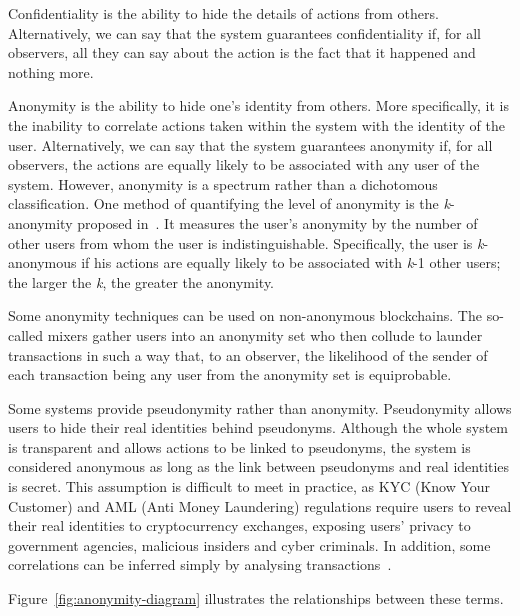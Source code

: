 \documentclass[pdftex,twocolumn,epjc3]{svjour3}
\begin{document}
{Confidentiality is the ability to hide the details of actions from others. Alternatively, we can say that the system guarantees confidentiality if, for all observers, all they can say about the action is the fact that it happened and nothing more.

Anonymity is the ability to hide one's identity from others. More specifically, it is the inability to correlate actions taken within the system with the identity of the user. Alternatively, we can say that the system guarantees anonymity if, for all observers, the actions are equally likely to be associated with any user of the system. However, anonymity is a spectrum rather than a dichotomous classification. One method of quantifying the level of anonymity is the \textit{k}-anonymity proposed in~\cite{sweeneyKanonymityModelProtecting2002}. It measures the user's anonymity by the number of other users from whom the user is indistinguishable. Specifically, the user is \textit{k}-anonymous if his actions are equally likely to be associated with \textit{k}-1 other users; the larger the \textit{k}, the greater the anonymity.

Some anonymity techniques can be used on non-anonymous blockchains. The so-called mixers gather users into an anonymity set who then collude to launder transactions in such a way that, to an observer, the likelihood of the sender of each transaction being any user from the anonymity set is equiprobable.

Some systems provide pseudonymity rather than anonymity. Pseudonymity allows users to hide their real identities behind pseudonyms. Although the whole system is transparent and allows actions to be linked to pseudonyms, the system is considered anonymous as long as the link between pseudonyms and real identities is secret. This assumption is difficult to meet in practice, as KYC (Know Your Customer) and AML (Anti Money Laundering) regulations require users to reveal their real identities to cryptocurrency exchanges, exposing users' privacy to government agencies, malicious insiders and cyber criminals. In addition, some correlations can be inferred simply by analysing transactions~\cite{androulakiEvaluatingUserPrivacy2013, oberStructureAnonymityBitcoin2013}.

Figure~\ref{fig:anonymity-diagram} illustrates the relationships between these terms.

}
\end{document}
